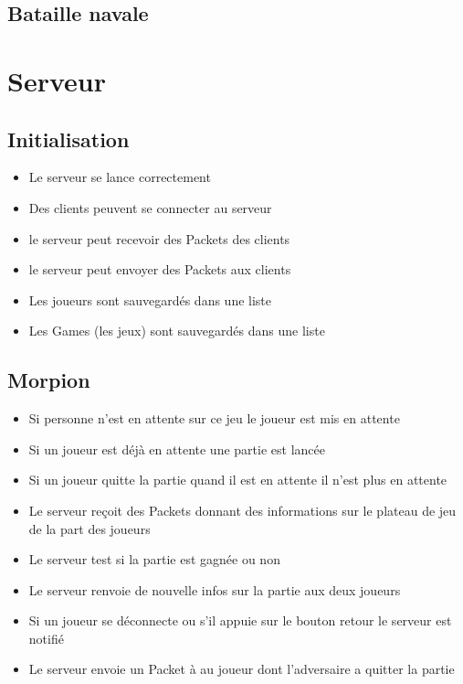 \documentclass{report}
\begin{document}
\subsection{Bataille navale}


\section{Serveur}

\subsection{Initialisation}
\begin{itemize}
  \item Le serveur se lance correctement
  \item Des clients peuvent se connecter au serveur
  \item le serveur peut recevoir des Packets des clients
  \item le serveur peut envoyer des Packets aux clients
  \item Les joueurs sont sauvegardés dans une liste
  \item Les Games (les jeux) sont sauvegardés dans une liste
\end{itemize}

\subsection{Morpion}
\begin{itemize}
  \item Si personne n'est en attente sur ce jeu le joueur est mis en attente
  \item Si un joueur est déjà en attente une partie est lancée
  \item Si un joueur quitte la partie quand il est en attente il n'est plus en attente
  \item Le serveur reçoit des Packets donnant des informations sur le plateau de jeu de la part des joueurs
  \item Le serveur test si la partie est gagnée ou non
  \item Le serveur renvoie de nouvelle infos sur la partie aux deux joueurs
  \item Si un joueur se déconnecte ou s'il appuie sur le bouton retour le serveur est notifié
  \item Le serveur envoie un Packet à au joueur dont l'adversaire a quitter la partie
\end{itemize}
\end{document}
